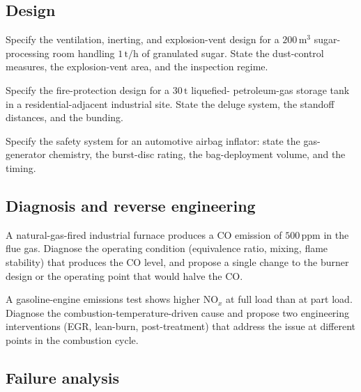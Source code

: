 \subsection*{Design}

\begin{exercise}
Specify the ventilation, inerting, and explosion-vent design for a
$200\,\text{m}^3$ sugar-processing room handling $1\,\text{t}/\text{h}$
of granulated sugar. State the dust-control measures, the
explosion-vent area, and the inspection regime.
\end{exercise}

\begin{exercise}
Specify the fire-protection design for a $30\,\text{t}$ liquefied-
petroleum-gas storage tank in a residential-adjacent industrial site.
State the deluge system, the standoff distances, and the bunding.
\end{exercise}

\begin{exercise}
Specify the safety system for an automotive airbag inflator: state the
gas-generator chemistry, the burst-disc rating, the bag-deployment
volume, and the timing.
\end{exercise}

\subsection*{Diagnosis and reverse engineering}

\begin{exercise}
A natural-gas-fired industrial furnace produces a CO emission of
$500\,\text{ppm}$ in the flue gas. Diagnose the operating condition
(equivalence ratio, mixing, flame stability) that produces the CO
level, and propose a single change to the burner design or the
operating point that would halve the CO.
\end{exercise}

\begin{exercise}
A gasoline-engine emissions test shows higher NO$_x$ at full load
than at part load. Diagnose the combustion-temperature-driven cause
and propose two engineering interventions (EGR, lean-burn,
post-treatment) that address the issue at different points in the
combustion cycle.
\end{exercise}

\subsection*{Failure analysis}

